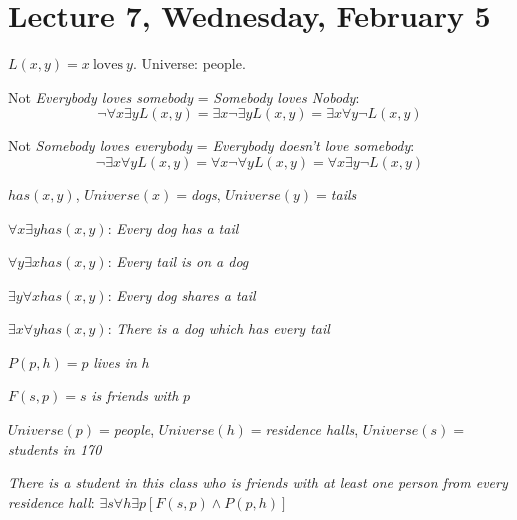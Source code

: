 \section{Lecture 7, Wednesday, February 5}

\begin{ex}

$L(x, y) = x\ \mathrm{loves}\ y$. Universe: people.

Not \textit{Everybody loves somebody} = \textit{Somebody loves Nobody}: $$\lnot \forall x \exists y L(x, y) = \exists x \lnot \exists y L(x, y) = \exists x \forall y \lnot L(x, y)$$

Not \textit{Somebody loves everybody} = \textit{Everybody doesn't love somebody}: $$\lnot \exists x \forall y L(x, y) = \forall x \lnot \forall y L(x, y) = \forall x \exists y \lnot L(x, y)$$

\end{ex}

\begin{ex}

$has(x, y)$, $Universe(x) = $\textit{dogs}, $Universe(y) = $\textit{tails}

$\forall x \exists y {has} (x, y)$: \textit{Every dog has a tail}

$\forall y \exists x {has} (x, y)$: \textit{Every tail is on a dog}

$\exists y \forall x {has} (x, y)$: \textit{Every dog shares a tail}

$\exists x \forall y {has} (x, y)$: \textit{There is a dog which has every tail}

\end{ex}

\begin{ex}

$P(p, h) = p$ \textit{lives in} $h$

$F(s, p) = s$ \textit{is friends with} $p$

$Universe(p) = $\textit{people}, $Universe(h) = $\textit{residence halls}, $Universe(s) = $\textit{students in 170}

\textit{There is a student in this class who is friends with at least one person from every residence hall}: $\exists s \forall h \exists p [F(s, p) \land P(p, h)]$

\end{ex}

